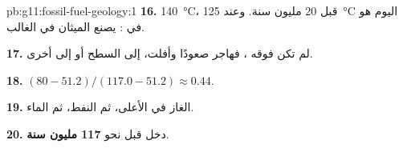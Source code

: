 \begin{solution}{pb:g11:fossil-fuel-geology:1}
\textbf{16.} \qty{140}{\degreeCelsius}، قبل 20 مليون سنة. وعند
\qty{125}{\degreeCelsius} اليوم هو في : يصنع الميثان في
الغالب.

\textbf{17.} لم تكن فوقه ، فهاجر صعودًا وأفلت، إلى
السطح أو إلى  أخرى.

\textbf{18.} $(80 - 51.2)/(117.0 - 51.2) \approx 0.44$.

\textbf{19.} الغاز في الأعلى، ثم النفط، ثم الماء.

\textbf{20.} دخل   قبل نحو \textbf{117
مليون سنة}.
\end{solution}
